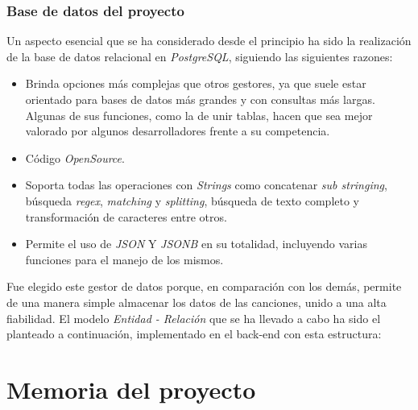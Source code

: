 \documentclass{article}
\begin{document}
\subsubsection{Base de datos del proyecto}
Un aspecto esencial que se ha considerado desde el principio ha sido la realización de la base de datos relacional en \textit{PostgreSQL}, siguiendo las siguientes razones:
\begin{itemize}
	\item Brinda opciones más complejas que otros gestores, ya que suele estar orientado para bases de datos más grandes y con consultas más largas. Algunas de sus funciones, como la de unir tablas, hacen que sea mejor valorado por algunos desarrolladores frente a su competencia.
	\item Código \textit{OpenSource}.
	\item Soporta todas las operaciones con \textit{Strings} como concatenar \textit{sub stringing}, búsqueda \textit{regex}, \textit{matching} y \textit{splitting}, búsqueda de texto completo y transformación de caracteres entre otros.
	\item Permite el uso de \textit{JSON} Y \textit{JSONB} en su totalidad, incluyendo varias funciones para el manejo de los mismos.
\end{itemize}
Fue elegido este gestor de datos porque, en comparación con los demás, permite de una manera simple almacenar los datos de las canciones, unido a una alta fiabilidad.
\newpage
El modelo \textit{Entidad - Relación} que se ha llevado a cabo ha sido el planteado a continuación, implementado en el back-end con esta estructura:
\begin{figure}[H]
	\hspace*{-3.9cm}
\end{figure}
\newpage
\section{Memoria del proyecto}
\end{document}

